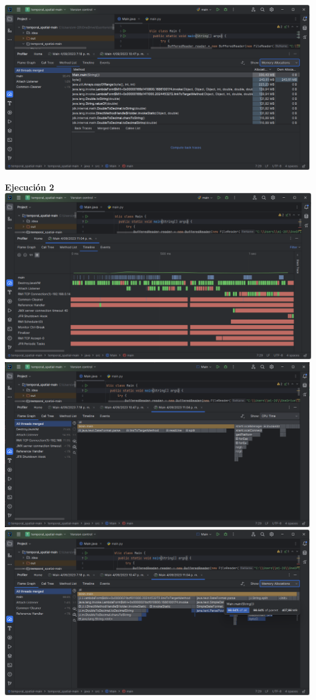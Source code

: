 \documentclass[a4paper,twocolumn,10pt]{article}
\begin{document}
\includegraphics[width=0.9\linewidth]{HP Ryzen 5500U/Method List Memory Allocation 1.png}

\textbf{Ejecución 2\\}
\includegraphics[width=0.9\linewidth]{HP Ryzen 5500U/TimeLine 2.png}
\includegraphics[width=0.9\linewidth]{HP Ryzen 5500U/FlameGraph CPU 2.png}
\includegraphics[width=0.9\linewidth]{HP Ryzen 5500U/FlameGraph Memory Allocation 2.png}
\end{document}
